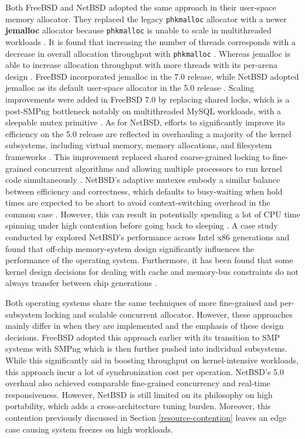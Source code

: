 Both FreeBSD and NetBSD adopted the same approach in their user-space memory allocator. They replaced the legacy \texttt{phkmalloc}
allocator with a newer \textbf{jemalloc} allocator because \texttt{phkmalloc} is unable to scale in multithreaded workloads
\parencite{evans2006}. It is found that increasing the number of threads corresponds with a decrease in overall allocation
throughput with \texttt{phkmalloc} \parencite{evans2006}. Whereas jemalloc is able to increase allocation throughput with more
threads with its per-arena design \parencite{evans2006}. FreeBSD incorporated jemalloc in the 7.0 release, while NetBSD adopted
jemalloc as its default user-space allocator in the 5.0 release \parencites{netbsd_jemalloc}{evans2006}. Scaling improvements
were added in FreeBSD 7.0 by replacing shared locks, which is a post-SMPng bottleneck notably on multithreaded MySQL workloads,
with a sleepable mutex primitive \parencite{kennaway}. As for NetBSD, efforts to significantly improve its efficiency on the
5.0 release are reflected in overhauling a majority of the kernel subsystems, including virtual memory, memory allocations,
and filesystem frameworks \parencites{lwn330994}{lwn332022}. This improvement replaced shared coarse-grained locking to
fine-grained concurrent algorithms and allowing multiple processors to run kernel code simultaneously \parencites{lwn330994}{lwn332022}.
NetBSD's adaptive mutexes embody a similar balance between efficiency and correctness, which defaults to busy-waiting when hold times
are expected to be short to avoid context-switching overhead in the common case \parencite{netbsd_locking}. However, this can
result in potentially spending a lot of CPU time spinning under high contention before going back to sleeping \parencite{netbsd_locking}.
A case study conducted by \textcite{brown_seltzer} explored NetBSD's performance across Intel x86 generations and found that
off-chip memory-system design significantly influences the performance of the operating system. Furthermore, it has been found
that some kernel design decisions for dealing with cache and memory-bus constraints do not always transfer between chip
generations \parencite{brown_seltzer}.

Both operating systems share the same techniques of more fine-grained and per-subsystem locking and scalable concurrent
allocator. However, these approaches mainly differ in when they are implemented and the emphasis of these design decisions.
FreeBSD adopted this approach earlier with its transition to SMP systems with SMPng which is then further pushed into individual
subsystems. While this significantly aid in boosting throughput on kernel-intensive workloads, this approach incur a lot of
synchronization cost per operation. NetBSD's 5.0 overhaul also achieved comparable fine-grained concurrency and real-time
responsiveness. However, NetBSD is still limited on its philosophy on high portability, which adds a cross-architecture tuning
burden. Moreover, this contention previously discussed in Section \ref{resource-contention} leaves an edge case causing
system freezes on high workloads.

